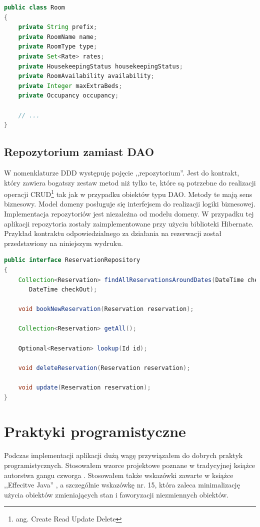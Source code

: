 \documentclass[a4paper,onecolumn,oneside,11pt,wide,floatssmall]{mwrep}
\theoremstyle{definition}
\theoremstyle{plain}%
\theoremstyle{remark}
\begin{document}
\begin{lstlisting}[language=Java,style=outcode,caption=Agregat zawierający obiekty wartości]
public class Room
{
    private String prefix; 
    private RoomName name;
    private RoomType type;
    private Set<Rate> rates;
    private HousekeepingStatus housekeepingStatus;
    private RoomAvailability availability;
    private Integer maxExtraBeds;
    private Occupancy occupancy;

    // ...
}
\end{lstlisting}

\subsection{Repozytorium zamiast DAO}
W nomenklaturze DDD występuję pojęcie ,,repozytorium''. Jest do kontrakt, który zawiera bogatszy zestaw metod niż tylko te, które są potrzebne do realizacji operacji CRUD\footnote{ang. Create Read Update Delete} tak jak w przypadku obiektów typu DAO. Metody te mają sens biznesowy. Model domeny posługuje się interfejsem do realizacji logiki biznesowej. Implementacja repozytoriów jest niezależna od modelu domeny. W przypadku tej aplikacji repozytoria zostały zaimplementowane przy użyciu biblioteki Hibernate. Przykład kontraktu odpowiedzialnego za działania na rezerwacji został przedstawiony na niniejszym wydruku.

\begin{lstlisting}[language=Java,style=outcode,caption=Repozytorium rezerwacji]
public interface ReservationRepository
{
    Collection<Reservation> findAllReservationsAroundDates(DateTime checkIn,
       DateTime checkOut);

    void bookNewReservation(Reservation reservation);

    Collection<Reservation> getAll();

    Optional<Reservation> lookup(Id id);

    void deleteReservation(Reservation reservation);

    void update(Reservation reservation);
}
\end{lstlisting}

\section{Praktyki programistyczne}
Podczas implementacji aplikacji dużą wagę przywiązałem do dobrych praktyk programistycznych. Stosowałem wzorce projektowe poznane w tradycyjnej książce autorstwa gangu czworga \cite{gamma1994design}. Stosowałem także wskazówki zawarte w książce ,,Effecitve Java'' \cite{bloch2008effective}, a szczególnie wskazówkę nr. 15, która zaleca minimalizację użycia obiektów zmieniających stan i faworyzacji niezmiennych obiektów.
\end{document}
